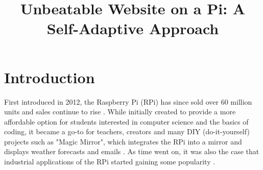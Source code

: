 \documentclass[conference]{IEEEtran}
\begin{document}
\title{Unbeatable Website on a Pi: A Self-Adaptive Approach\\
}

\author{

    \and

}

\maketitle



\section{\textbf{Introduction}}\label{intro}
First introduced in 2012, the Raspberry Pi (RPi) has since sold over 60 million units and sales continue to rise \cite{pi_sales}. While initially created to provide a more affordable option for students interested in computer science and the basics of coding, it became a go-to for teachers, creators and many DIY (do-it-yourself) projects such as "Magic Mirror", which integrates the RPi into a mirror and displays weather forecasts and emails \cite{magic_mirror}. As time went on, it was also the case that industrial applications of the RPi started gaining some popularity \cite{pi_history}.
\end{document}

